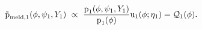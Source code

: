 \begin{equation}
  \tilde{\text{p}}_{\text{meld}, 1}(\phi, \psi_{1}, Y_{1}) \,\,\propto\,\,
  \frac {
    \text{p}_{1}(\phi, \psi_1, Y_{1})
  } {
    \text{p}_{1}(\phi)
  }
  \text{u}_{1}(\phi; \eta_{1})
  =
  \mathcal{Q}_{1}(\phi).
  \label{eqn:stage-one-target}
\end{equation}